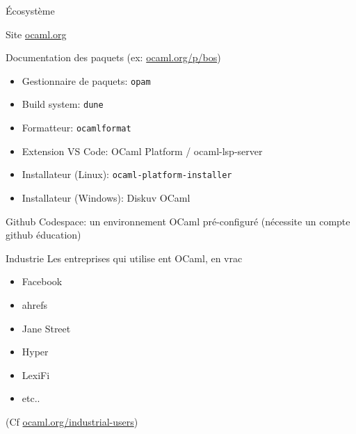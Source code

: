
\begin{frame}{Écosystème}
    

Site \href{https://ocaml.org}{ocaml.org}

Documentation des paquets (ex: \href{https://ocaml.org/p/bos}{ocaml.org/p/bos})


\begin{itemize}[label=$-$]
\item Gestionnaire de paquets: \texttt{opam}
\item Build system: \texttt{dune}
\item Formatteur: \texttt{ocamlformat}
\item Extension VS Code: OCaml Platform / ocaml-lsp-server
\item Installateur (Linux): \texttt{ocaml-platform-installer}
\item Installateur (Windows): Diskuv OCaml
\end{itemize}
    

Github Codespace: un environnement OCaml pré-configuré (nécessite un compte github éducation)

\end{frame}

\begin{frame}{Industrie}
    Les entreprises qui utilise ent OCaml, en vrac 
   \begin{itemize}[label=\small{}]
       \item Facebook
       \item ahrefs
       \item Jane Street
       \item Hyper
       \item LexiFi
       \item etc..
   \end{itemize}
   
    (Cf \href{https://ocaml.org/industrial-users}{ocaml.org/industrial-users})
    
\end{frame}
